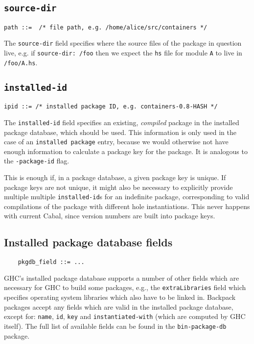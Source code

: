 \documentclass{article}
\newcommand{\Red}[1]{{\color{red} #1}}
\begin{document}
\subsection{\texttt{source-dir}}

\begin{verbatim}
path ::=  /* file path, e.g. /home/alice/src/containers */
\end{verbatim}

The \texttt{source-dir} field specifies where the source files of
the package in question live, e.g. if \texttt{source-dir: /foo}
then we expect the \texttt{hs} file for module \texttt{A} to live
in \texttt{/foo/A.hs}.

\subsection{\texttt{installed-id}}

\begin{verbatim}
ipid ::= /* installed package ID, e.g. containers-0.8-HASH */
\end{verbatim}

The \texttt{installed-id} field specifies an existing, \emph{compiled} package in
the installed package database, which should be used.  This information
is only used in the case of an \texttt{installed package} entry, because
we would otherwise not have enough information to calculate a package
key for the package.  It is analogous to the \texttt{-package-id} flag.

\Red{This is enough if, in a package database, a given package key is
    unique.  If package keys are not unique, it might also be necessary
    to explicitly provide multiple multiple \texttt{installed-id}s for
an indefinite package, corresponding to valid compilations of the
package with different hole instantiations.  This never happens with
current Cabal, since version numbers are built into package keys.}

\subsection{Installed package database fields}

\begin{verbatim}
    pkgdb_field ::= ...
\end{verbatim}

GHC's installed package database supports a number of other fields
which are necessary for GHC to build some packages, e.g., the \texttt{extraLibraries}
field which specifies operating system libraries which also have to
be linked in.  Backpack packages accept any fields which are valid in the
installed package database, except for: \texttt{name}, \texttt{id}, \texttt{key}
and \texttt{instantiated-with} (which are computed by GHC itself).
The full list of available fields can be found in the \texttt{bin-package-db}
package.
\end{document}
